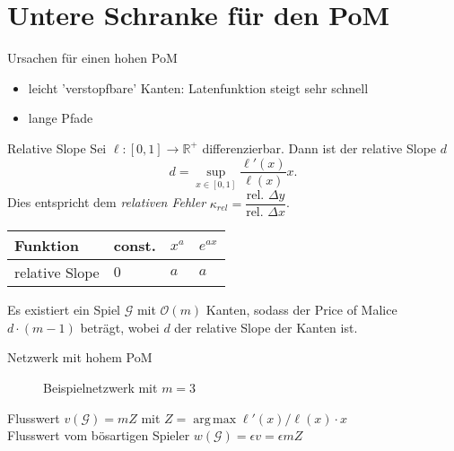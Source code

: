 \documentclass{beamer}
\DeclareMathOperator*{\argmax}{arg\,max}
\begin{document}
\section{Untere Schranke für den PoM}

\begin{frame}{Ursachen für einen hohen PoM}
	\begin{itemize}
		\item leicht 'verstopfbare' Kanten: Latenfunktion steigt sehr schnell
		\item lange Pfade
	\end{itemize}
\end{frame}

\begin{frame}{Relative Slope}
	Sei $\ell : [0,1] \to \mathbb R^+$ differenzierbar.
	Dann ist der \alert{relative Slope} $d$
	\[ d = \sup_{x \in [0,1]} \dfrac{\ell'(x)}{\ell(x)} x .\]
	Dies entspricht dem \emph{relativen Fehler} $\kappa_{rel} = \dfrac{\text{rel. } \Delta y}{\text{rel. } \Delta x}$.
	
	\begin{table}[]
		\begin{tabular}{@{}llll@{}}
			\toprule
			Funktion       & const. & $x^a$ & $e^{ax}$ \\ \midrule
			relative Slope & $0$      & $a$     & $a$        \\ \bottomrule
		\end{tabular}
	\end{table}
	\begin{theorem}
		Es existiert ein Spiel $\mathcal G$ mit $\mathcal O(m)$ Kanten, sodass der Price of Malice $d \cdot (m-1)$ beträgt, wobei $d$ der relative Slope der Kanten ist.
	\end{theorem}
\end{frame}

\begin{frame}{Netzwerk mit hohem PoM}
	\begin{figure}
	\caption{Beispielnetzwerk mit $m=3$}
	\end{figure}
	
	Flusswert $v(\mathcal G) = mZ$ mit $Z = \argmax \ell'(x)/\ell(x) \cdot x$ \\
	Flusswert vom bösartigen Spieler $w(\mathcal G) = \epsilon v = \epsilon m Z$
\end{frame}
\end{document}
